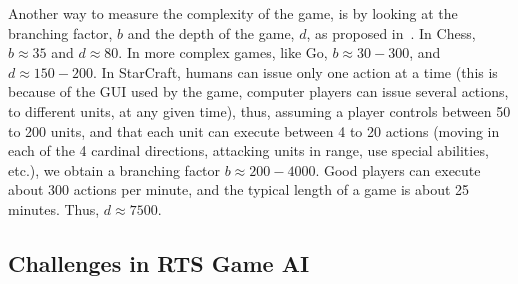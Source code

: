 \documentclass[journal]{IEEEtran}
\begin{document}
Another way  to measure the complexity  of the game, is  by looking at
the branching factor, $b$ and the depth of the game, $d$, as proposed in~\cite{Gaby}. In Chess, $b \approx 35$ and $d \approx 80$. In more complex games, like Go, $b \approx 30 - 300$, and $d \approx 150 - 200$. In StarCraft, humans can issue only one action at a time (this is because of the GUI used by the game, computer players can issue several actions, to different units, at any given time), thus, assuming a player controls between 50 to 200 units, and that each unit can execute between 4 to 20 actions (moving in each of the 4 cardinal directions, attacking units in range, use special abilities, etc.), we obtain a branching factor $b \approx 200 - 4000$. Good players can execute about 300 actions per minute, and the typical length of a game is about 25 minutes. Thus, $d \approx 7500$.






\subsection{Challenges in RTS Game AI}\label{subsec:challenges}
\end{document}
